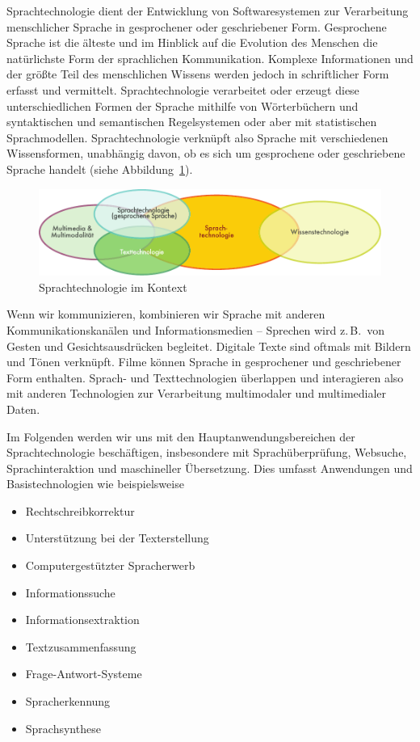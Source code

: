 \begin{multicols}{2}

Sprachtechnologie dient der Entwicklung von Softwaresystemen zur Verarbeitung menschlicher Sprache in gesprochener oder geschriebener Form. Gesprochene Sprache ist die älteste und im Hinblick auf die Evolution des Menschen die natürlichste Form der sprachlichen Kommunikation. Komplexe Informationen und der größte Teil des menschlichen Wissens werden jedoch in schriftlicher Form erfasst und vermittelt. Sprachtechnologie verarbeitet oder erzeugt diese unterschiedlichen Formen der Sprache mithilfe von 
Wörterbüchern und syntaktischen und semantischen Regelsystemen oder aber mit statistischen Sprachmodellen.  
Sprachtechnologie verknüpft also Sprache mit verschiedenen Wissensformen, unabhängig davon, ob es sich um gesprochene oder geschriebene Sprache handelt (siehe Abbildung~\ref{fig:ltincontext_de}).

\begin{figure}[htb]
  \center
  \includegraphics[width=\textwidth]{../_media/german/language_technologies}
  \caption{Sprachtechnologie im Kontext}
  \label{fig:ltincontext_de}
\end{figure}

Wenn wir kommunizieren, kombinieren wir Sprache mit anderen Kommunikationskanälen und Informationsmedien -- Sprechen wird z.\,B.~von Gesten und Gesichtsausdrücken begleitet. Digitale Texte sind oftmals mit Bildern und Tönen verknüpft. Filme können Sprache in gesprochener und geschriebener Form enthalten. Sprach- und Texttechnologien überlappen und interagieren also mit anderen Technologien zur Verarbeitung multimodaler und multimedialer Daten.

Im Folgenden werden wir uns mit den Hauptanwendungsbereichen der Sprachtechnologie beschäftigen, insbesondere mit Sprachüberprüfung, Websuche, Sprach\-inter\-aktion und maschineller Übersetzung. Dies umfasst Anwendungen und Basistechnologien wie beispielsweise

\begin{itemize}
\item Rechtschreibkorrektur
\item Unterstützung bei der Texterstellung
\item Computergestützter Spracherwerb
\item Informationssuche
\item Informationsextraktion
\item Textzusammenfassung
\item Frage-Antwort-Systeme
\item Spracherkennung 
\item Sprachsynthese
\end{itemize}


\end{multicols}
